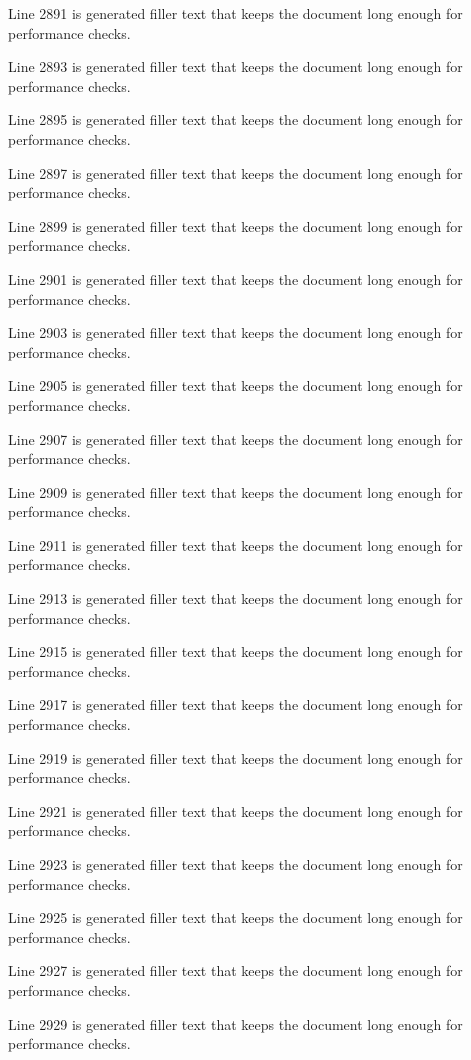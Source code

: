 Line 2891 is generated filler text that keeps the document long enough for performance checks.

Line 2893 is generated filler text that keeps the document long enough for performance checks.

Line 2895 is generated filler text that keeps the document long enough for performance checks.

Line 2897 is generated filler text that keeps the document long enough for performance checks.

Line 2899 is generated filler text that keeps the document long enough for performance checks.

Line 2901 is generated filler text that keeps the document long enough for performance checks.

Line 2903 is generated filler text that keeps the document long enough for performance checks.

Line 2905 is generated filler text that keeps the document long enough for performance checks.

Line 2907 is generated filler text that keeps the document long enough for performance checks.

Line 2909 is generated filler text that keeps the document long enough for performance checks.

Line 2911 is generated filler text that keeps the document long enough for performance checks.

Line 2913 is generated filler text that keeps the document long enough for performance checks.

Line 2915 is generated filler text that keeps the document long enough for performance checks.

Line 2917 is generated filler text that keeps the document long enough for performance checks.

Line 2919 is generated filler text that keeps the document long enough for performance checks.

Line 2921 is generated filler text that keeps the document long enough for performance checks.

Line 2923 is generated filler text that keeps the document long enough for performance checks.

Line 2925 is generated filler text that keeps the document long enough for performance checks.

Line 2927 is generated filler text that keeps the document long enough for performance checks.

Line 2929 is generated filler text that keeps the document long enough for performance checks.

